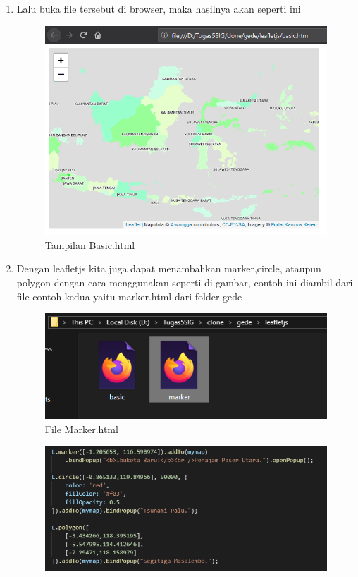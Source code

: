 \begin{enumerate}
\begin{figure}[H]
	\end{figure}
    \item Lalu buka file tersebut di browser, maka hasilnya akan seperti ini
    \hfill\break
    \begin{figure}[H]
		\includegraphics[width=12cm]{figures/Tugas5/1174077/3.png}
		\centering
		\caption{Tampilan Basic.html}
	\end{figure}
    \item Dengan leafletjs kita juga dapat menambahkan marker,circle, ataupun polygon dengan cara menggunakan seperti di gambar, contoh ini diambil dari file contoh kedua yaitu marker.html dari folder gede 
    \hfill\break
    \begin{figure}[H]
		\includegraphics[width=12cm]{figures/Tugas5/1174077/4.png}
		\centering
		\caption{File Marker.html}
	\end{figure}
	\begin{figure}[H]
		\includegraphics[width=12cm]{figures/Tugas5/1174077/6.png}

\end{figure}
\end{enumerate}
